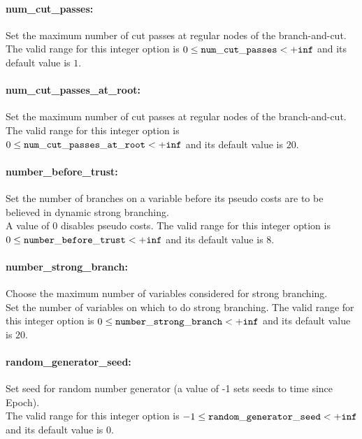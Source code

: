 \paragraph{num\_cut\_passes:}\label{opt:num_cut_passes} Set the maximum number of cut passes at regular nodes of the branch-and-cut. \\
 The valid range for this integer option is
$0 \le {\tt num\_cut\_passes } <  {\tt +inf}$
and its default value is $1$.


\paragraph{num\_cut\_passes\_at\_root:}\label{opt:num_cut_passes_at_root} Set the maximum number of cut passes at regular nodes of the branch-and-cut. \\
 The valid range for this integer option is
$0 \le {\tt num\_cut\_passes\_at\_root } <  {\tt +inf}$
and its default value is $20$.


\paragraph{number\_before\_trust:}\label{opt:number_before_trust} Set the number of branches on a variable before its pseudo costs are to be believed in dynamic strong branching. \\
 A value of 0 disables pseudo costs. The valid range for this integer option is
$0 \le {\tt number\_before\_trust } <  {\tt +inf}$
and its default value is $8$.


\paragraph{number\_strong\_branch:}\label{opt:number_strong_branch} Choose the maximum number of variables considered for strong branching. \\
 Set the number of variables on which to do strong branching. The valid range for this integer option is
$0 \le {\tt number\_strong\_branch } <  {\tt +inf}$
and its default value is $20$.


\paragraph{random\_generator\_seed:}\label{opt:random_generator_seed} Set seed for random number generator (a value of -1 sets seeds to time since Epoch). \\
 The valid range for this integer option is
$-1 \le {\tt random\_generator\_seed } <  {\tt +inf}$
and its default value is $0$.



